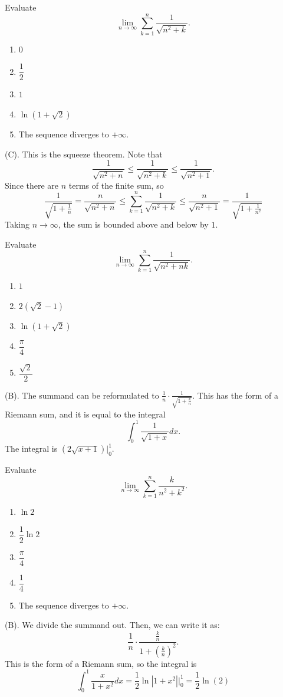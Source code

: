 \begin{exercise}
Evaluate
\[
\lim_{n\to\infty}\sum_{k=1}^{n}\frac{1}{\sqrt{n^2+k}}.
\]
\begin{enumerate}[label=(\Alph*)]
    \item $0$
    \item $\dfrac12$
    \item $1$
    \item $\ln(1+\sqrt2)$
    \item The sequence diverges to $+\infty$.
\end{enumerate}
\end{exercise}
\begin{solution}
(C). This is the squeeze theorem. Note that 
\[
\frac{1}{\sqrt{n^2 + n}} \leq \frac{1}{\sqrt{n^2 + k}} \leq \frac{1}{\sqrt{n^2 + 1}}.
\]
Since there are $n$ terms of the finite sum, so
\[
\frac{1}{\sqrt{1 + \frac{1}{n}}} = \frac{n}{\sqrt{n^2 + n}} \leq 
\sum_{k = 1}^n \frac{1}{\sqrt{n^2 + k}} \leq \frac{n}{\sqrt{n^2 + 1}} = \frac{1}{\sqrt{1 + \frac{1}{n^2}}}
\]
Taking $n \rightarrow \infty$, the sum is bounded above and below by $1$.
\end{solution}

\begin{exercise}
Evaluate
\[
\lim_{n\to\infty}\sum_{k=1}^{n}\frac{1}{\sqrt{n^2+nk}}.
\]
\begin{enumerate}[label=(\Alph*)]
    \item $1$
    \item $2(\sqrt2-1)$
    \item $\ln(1+\sqrt2)$
    \item $\dfrac{\pi}{4}$
    \item $\dfrac{\sqrt2}{2}$
\end{enumerate}
\end{exercise}
\begin{solution}
(B). The summand can be reformulated to $\frac{1}{n} \cdot \frac{1}{\sqrt{1 + \frac{k}{n}}}$.
This has the form of a Riemann sum, and it is equal to the integral 
\[
\int_0^1 \frac{1}{\sqrt{1 + x}} dx.
\]
The integral is $\left(2\sqrt{x + 1}\right) \Big|_0^1$.
\end{solution}

\begin{exercise}
Evaluate
\[
\lim_{n\to\infty}\sum_{k=1}^{n}\frac{k}{n^2+k^2}.
\]
\begin{enumerate}[label=(\Alph*)]
    \item $\ln2$
    \item $\dfrac12\ln2$
    \item $\dfrac{\pi}{4}$
    \item $\dfrac14$
    \item The sequence diverges to $+\infty$.
\end{enumerate}
\end{exercise}
\begin{solution}
(B). We divide the summand out. Then, we can write it as:
\[
\frac{1}{n} \cdot \frac{\frac{k}{n}}{1 + \left(\frac{k}{n}\right)^2}.
\]
This is the form of a Riemann sum, so the integral is 
\[
\int_0^1 \frac{x}{1 + x^2} dx = \frac{1}{2}\ln|1 + x^2| \Bigg|_0^1 
= \frac{1}{2} \ln(2)
\]
\end{solution}

